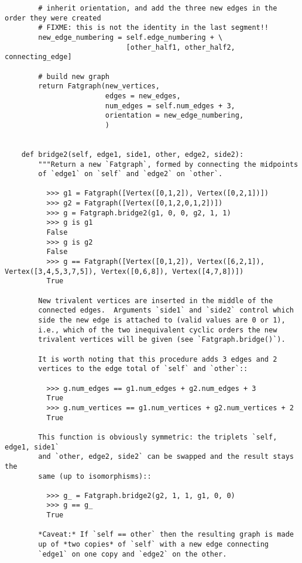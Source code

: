 \begin{lstlisting}
        # inherit orientation, and add the three new edges in the order they were created
        # FIXME: this is not the identity in the last segment!!
        new_edge_numbering = self.edge_numbering + \
                             [other_half1, other_half2, connecting_edge]

        # build new graph 
        return Fatgraph(new_vertices,
                        edges = new_edges,
                        num_edges = self.num_edges + 3,
                        orientation = new_edge_numbering,
                        )
    
    
    def bridge2(self, edge1, side1, other, edge2, side2):
        """Return a new `Fatgraph`, formed by connecting the midpoints
        of `edge1` on `self` and `edge2` on `other`.
        
          >>> g1 = Fatgraph([Vertex([0,1,2]), Vertex([0,2,1])])
          >>> g2 = Fatgraph([Vertex([0,1,2,0,1,2])])
          >>> g = Fatgraph.bridge2(g1, 0, 0, g2, 1, 1)
          >>> g is g1
          False
          >>> g is g2
          False
          >>> g == Fatgraph([Vertex([0,1,2]), Vertex([6,2,1]), Vertex([3,4,5,3,7,5]), Vertex([0,6,8]), Vertex([4,7,8])])
          True
          
        New trivalent vertices are inserted in the middle of the
        connected edges.  Arguments `side1` and `side2` control which
        side the new edge is attached to (valid values are 0 or 1),
        i.e., which of the two inequivalent cyclic orders the new
        trivalent vertices will be given (see `Fatgraph.bridge()`).
        
        It is worth noting that this procedure adds 3 edges and 2
        vertices to the edge total of `self` and `other`::
        
          >>> g.num_edges == g1.num_edges + g2.num_edges + 3
          True
          >>> g.num_vertices == g1.num_vertices + g2.num_vertices + 2
          True
          
        This function is obviously symmetric: the triplets `self, edge1, side1`
        and `other, edge2, side2` can be swapped and the result stays the
        same (up to isomorphisms)::

          >>> g_ = Fatgraph.bridge2(g2, 1, 1, g1, 0, 0)
          >>> g == g_
          True

        *Caveat:* If `self == other` then the resulting graph is made
        up of *two copies* of `self` with a new edge connecting
        `edge1` on one copy and `edge2` on the other.
         

\end{lstlisting}
